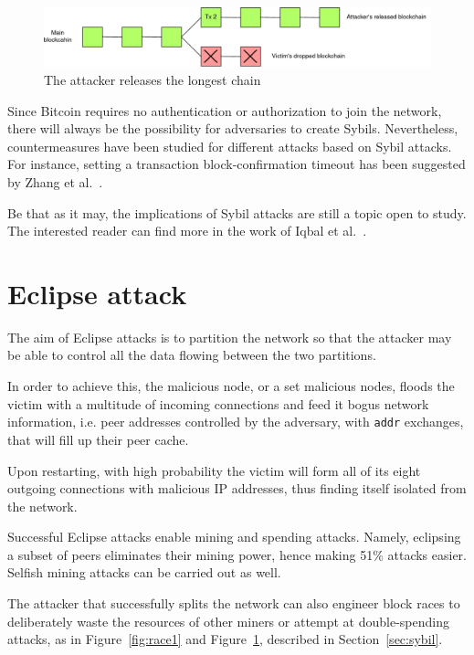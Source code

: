 \begin{figure}[h!]
	\includegraphics[width=.9\textwidth]{pict/blockrace2.png}
	\centering
	\caption{The attacker releases the longest chain}
	\label{fig:race2}
\end{figure}

Since Bitcoin requires no authentication or authorization to join the network, there will always be the possibility for adversaries to create Sybils. Nevertheless, countermeasures have been studied for different attacks based on Sybil attacks. For instance, setting a transaction block-confirmation timeout has been suggested by Zhang et al.~\cite{zhang-sybil-mitigations}.

Be that as it may, the implications of Sybil attacks are still a topic open to study. The interested reader can find more in the work of Iqbal et al.~\cite{iqbal-sybil}.

\section{Eclipse attack}\label{sec:eclipse}
The aim of Eclipse attacks is to partition the network so that the attacker may be able to control all the data flowing between the two partitions.

In order to achieve this, the malicious node, or a set malicious nodes, floods the victim with a multitude of incoming connections and feed it bogus network information, i.e. peer addresses controlled by the adversary, with \texttt{addr} exchanges, that will fill up their peer cache.

Upon restarting, with high probability the victim will form all of its eight outgoing connections with malicious IP addresses, thus finding itself isolated from the network.

Successful Eclipse attacks enable mining and spending attacks. Namely, eclipsing a subset of peers eliminates their mining power, hence making 51\% attacks easier. Selfish mining attacks can be carried out as well.

The attacker that successfully splits the network can also engineer block races to deliberately waste the resources of other miners or attempt at double-spending attacks, as in Figure~\ref{fig:race1} and Figure~\ref{fig:race2}, described in Section~\ref{sec:sybil}.

